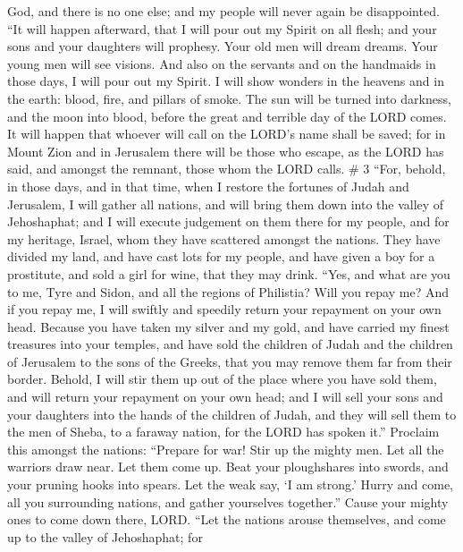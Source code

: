 God, and there is no one else; and my people will never again be
disappointed.  ``It will happen afterward, that I will pour
out my Spirit on all flesh; and your sons and your daughters will
prophesy. Your old men will dream dreams. Your young men will see
visions.  And also on the servants and on the handmaids in
those days, I will pour out my Spirit.  I will show wonders
in the heavens and in the earth: blood, fire, and pillars of smoke.
 The sun will be turned into darkness, and the moon into
blood, before the great and terrible day of the LORD comes.
 It will happen that whoever will call on the LORD's name
shall be saved; for in Mount Zion and in Jerusalem there will be those
who escape, as the LORD has said, and amongst the remnant, those whom
the LORD calls. \# 3  ``For, behold, in those days, and in
that time, when I restore the fortunes of Judah and Jerusalem,
 I will gather all nations, and will bring them down into
the valley of Jehoshaphat; and I will execute judgement on them there
for my people, and for my heritage, Israel, whom they have scattered
amongst the nations. They have divided my land,  and have
cast lots for my people, and have given a boy for a prostitute, and sold
a girl for wine, that they may drink.  ``Yes, and what are
you to me, Tyre and Sidon, and all the regions of Philistia? Will you
repay me? And if you repay me, I will swiftly and speedily return your
repayment on your own head.  Because you have taken my
silver and my gold, and have carried my finest treasures into your
temples,  and have sold the children of Judah and the
children of Jerusalem to the sons of the Greeks, that you may remove
them far from their border.  Behold, I will stir them up out
of the place where you have sold them, and will return your repayment on
your own head;  and I will sell your sons and your daughters
into the hands of the children of Judah, and they will sell them to the
men of Sheba, to a faraway nation, for the LORD has spoken it.''
 Proclaim this amongst the nations: ``Prepare for war! Stir
up the mighty men. Let all the warriors draw near. Let them come up.
 Beat your ploughshares into swords, and your pruning hooks
into spears. Let the weak say, `I am strong.'  Hurry and
come, all you surrounding nations, and gather yourselves together.''
Cause your mighty ones to come down there, LORD.  ``Let the
nations arouse themselves, and come up to the valley of Jehoshaphat; for
